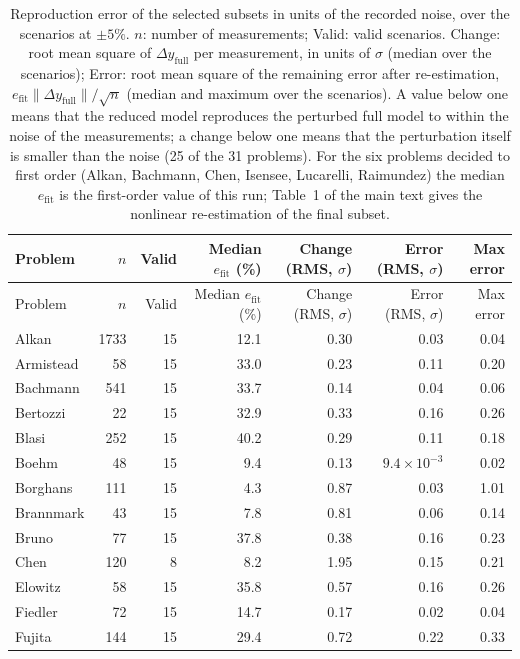 \begin{longtable}{@{}lrrrrrr@{}}
\caption{Reproduction error of the selected subsets in units of the recorded noise, over the scenarios at $\pm5\%$. $n$: number of measurements; Valid: valid scenarios. Change: root mean square of $\Delta y_{\mathrm{full}}$ per measurement, in units of $\sigma$ (median over the scenarios); Error: root mean square of the remaining error after re-estimation, $e_{\mathrm{fit}}\|\Delta y_{\mathrm{full}}\|/\sqrt n$ (median and maximum over the scenarios). A value below one means that the reduced model reproduces the perturbed full model to within the noise of the measurements; a change below one means that the perturbation itself is smaller than the noise (25 of the 31 problems). For the six problems decided to first order (Alkan, Bachmann, Chen, Isensee, Lucarelli, Raimundez) the median $e_{\mathrm{fit}}$ is the first-order value of this run; Table~1 of the main text gives the nonlinear re-estimation of the final subset.}\label{tab:abs}\\
\toprule
Problem & $n$ & Valid & Median $e_{\mathrm{fit}}$ (\%) & Change (RMS, $\sigma$) & Error (RMS, $\sigma$) & Max error \\
\midrule
\endfirsthead
\toprule
Problem & $n$ & Valid & Median $e_{\mathrm{fit}}$ (\%) & Change (RMS, $\sigma$) & Error (RMS, $\sigma$) & Max error \\
\midrule
\endhead
Alkan & 1733 & 15 & 12.1 & 0.30 & 0.03 & 0.04 \\
Armistead & 58 & 15 & 33.0 & 0.23 & 0.11 & 0.20 \\
Bachmann & 541 & 15 & 33.7 & 0.14 & 0.04 & 0.06 \\
Bertozzi & 22 & 15 & 32.9 & 0.33 & 0.16 & 0.26 \\
Blasi & 252 & 15 & 40.2 & 0.29 & 0.11 & 0.18 \\
Boehm & 48 & 15 & 9.4 & 0.13 & $9.4\times10^{-3}$ & 0.02 \\
Borghans & 111 & 15 & 4.3 & 0.87 & 0.03 & 1.01 \\
Brannmark & 43 & 15 & 7.8 & 0.81 & 0.06 & 0.14 \\
Bruno & 77 & 15 & 37.8 & 0.38 & 0.16 & 0.23 \\
Chen & 120 & 8 & 8.2 & 1.95 & 0.15 & 0.21 \\
Elowitz & 58 & 15 & 35.8 & 0.57 & 0.16 & 0.26 \\
Fiedler & 72 & 15 & 14.7 & 0.17 & 0.02 & 0.04 \\
Fujita & 144 & 15 & 29.4 & 0.72 & 0.22 & 0.33 \\

\end{longtable}

